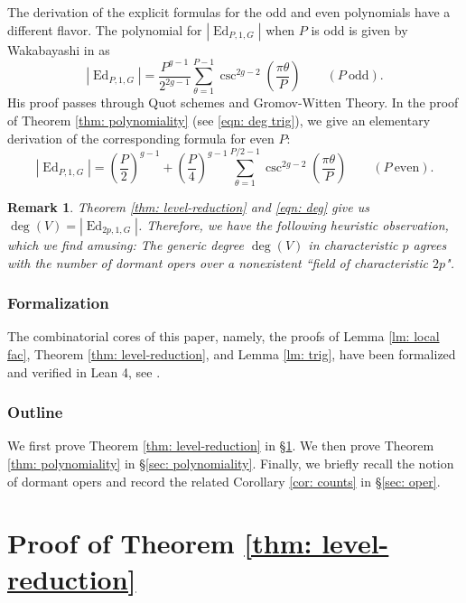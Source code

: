 \documentclass[11pt]{amsart}
\newtheorem{remark}[theorem]{Remark}
\newcommand{\Ed}{\operatorname{Ed}}
\begin{document}
The derivation of the explicit formulas for the odd and even polynomials have a different flavor.
The polynomial for $|\Ed_{P,1,G}|$ when $P$ is odd is given by Wakabayashi in \cite[Theorem A]{WakFormula} as 
\[
        |\Ed_{P,1,G}|
        =
        \frac{P^{g-1}}{2^{2g-1}}
        \sum_{\theta=1}^{P-1}
        \csc^{2g-2}\!\left(\frac{\pi\theta}{P}\right)
        \qquad (P\ \mathrm{odd}).
\]
His proof passes through Quot schemes and Gromov-Witten Theory.
In the proof of Theorem \ref{thm: polynomiality} (see \eqref{eqn: deg trig}), we give an elementary derivation of the corresponding formula for even $P$:
\[
        |\Ed_{P,1,G}|
        =
        \left(\frac P2\right)^{g-1}
        +
        \left(\frac P4\right)^{g-1}
        \sum_{\theta=1}^{P/2-1}
        \csc^{2g-2}\!\left(\frac{\pi\theta}{P}\right)
        \qquad (P\ \mathrm{even}).
\]

\begin{remark}
    Theorem \ref{thm: level-reduction} and \eqref{eqn: deg} give us $\deg(V)=|\Ed_{2p,1,G}|$.
Therefore, we have the following heuristic observation, which we find amusing:
The generic degree $\deg(V)$ in characteristic $p$ agrees with the number of dormant opers over a nonexistent ``field of characteristic $2p$".
\end{remark}

\subsubsection*{Formalization}
The combinatorial cores of this paper, namely, the proofs of Lemma \ref{lm: local fac}, Theorem \ref{thm: level-reduction}, and Lemma \ref{lm: trig}, have been formalized and verified in Lean 4, see \cite{VerschiebungLean}.

\subsubsection*{Outline}
We first prove Theorem \ref{thm: level-reduction} in \S\ref{sec: proof theorem 2}.
We then prove Theorem \ref{thm: polynomiality} in \S\ref{sec: polynomiality}.
Finally, we briefly recall the notion of dormant opers and record the related Corollary \ref{cor: counts} in \S\ref{sec: oper}.






\section{Proof of Theorem \ref{thm: level-reduction}}\label{sec: proof theorem 2}
\end{document}
